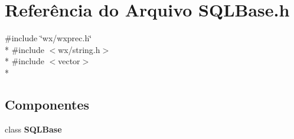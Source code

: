 \section{Referência do Arquivo S\+Q\+L\+Base.\+h}
\label{_s_q_l_base_8h}
{\ttfamily \#include \char`\"{}wx/wxprec.\+h\char`\"{}}\\*
{\ttfamily \#include $<$wx/string.\+h$>$}\\*
{\ttfamily \#include $<$vector$>$}\\*
\subsection*{Componentes}
\begin{DoxyCompactItemize}
\item 
class {\bf S\+Q\+L\+Base}
\end{DoxyCompactItemize}
